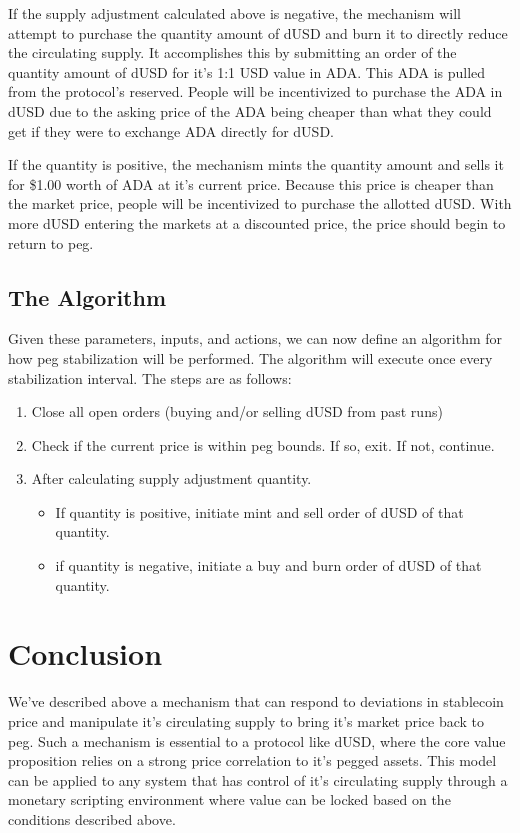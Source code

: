 \documentclass[12pt]{article}
\begin{document}
If the supply adjustment calculated above is negative, the mechanism will attempt to purchase the quantity amount of dUSD and burn it to directly reduce the circulating supply. It accomplishes this by submitting an order of the quantity amount of dUSD for it's 1:1 USD value in ADA. This ADA is pulled from the protocol's reserved. People will be incentivized to purchase the ADA in dUSD due to the asking price of the ADA being cheaper than what they could get if they were to exchange ADA directly for dUSD.

If the quantity is positive, the mechanism mints the quantity amount and sells it for \$1.00 worth of ADA at it's current price. Because this price is cheaper than the market price, people will be incentivized to purchase the allotted dUSD. With more dUSD entering the markets at a discounted price, the price should begin to return to peg.

\subsection{The Algorithm}

Given these parameters, inputs, and actions, we can now define an algorithm for how peg stabilization will be performed. The algorithm will execute once every stabilization interval. The steps are as follows:

\begin{enumerate}
    \item Close all open orders (buying and/or selling dUSD from past runs) 
    \item Check if the current price is within peg bounds. If so, exit. If not, continue.
    \item After calculating supply adjustment quantity.
        \begin{itemize}
            \item If quantity is positive, initiate mint and sell order of dUSD of that quantity.
            \item if quantity is negative, initiate a buy and burn order of dUSD of that quantity.
        \end{itemize}
\end{enumerate}


\section{Conclusion}

We've described above a mechanism that can respond to deviations in stablecoin price and manipulate it's circulating supply to bring it's market price back to peg. Such a mechanism is essential to a protocol like dUSD, where the core value proposition relies on a strong price correlation to it's pegged assets. This model can be applied to any system that has control of it's circulating supply through a monetary scripting environment where value can be locked based on the conditions described above.
\end{document}
